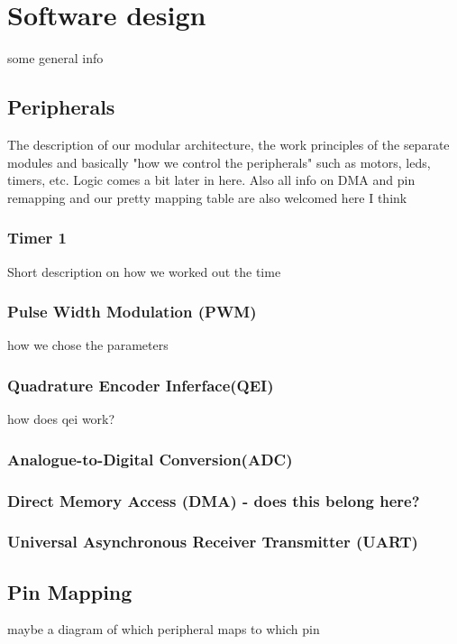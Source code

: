 \section{Software design}
some general info

\subsection{Peripherals} %
The description of our modular architecture, the work principles of the separate modules and basically "how we control the peripherals" such as motors, leds, timers, etc. Logic comes a bit later in here.
Also all info on DMA and pin remapping and our pretty mapping table are also welcomed here I think

\subsubsection*{Timer 1}
Short description on how we worked out the time

\subsubsection*{Pulse Width Modulation (PWM)}
how we chose the parameters

\subsubsection*{Quadrature Encoder Inferface(QEI)}
how does qei work?

\subsubsection*{Analogue-to-Digital Conversion(ADC)}

\subsubsection*{Direct Memory Access (DMA) - does this belong here?}

\subsubsection*{Universal Asynchronous Receiver Transmitter (UART)}


\subsection{Pin Mapping}
maybe a diagram of which peripheral maps to which pin


